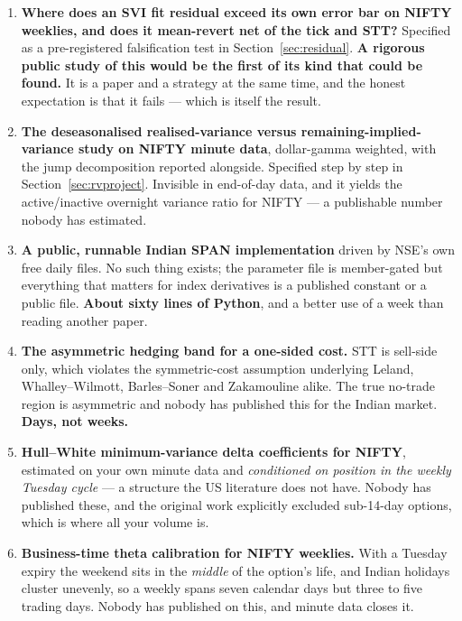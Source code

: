 \documentclass[11pt,a4paper]{article}
\begin{document}
\begin{enumerate}
\item \textbf{Where does an SVI fit residual exceed its own error bar on NIFTY
weeklies, and does it mean-revert net of the tick and STT?} Specified as a
pre-registered falsification test in Section~\ref{sec:residual}. \textbf{A rigorous
public study of this would be the first of its kind that could be found.} It is a
paper and a strategy at the same time, and the honest expectation is that it fails
--- which is itself the result.

\item \textbf{The deseasonalised realised-variance versus remaining-implied-variance
study on NIFTY minute data}, dollar-gamma weighted, with the jump decomposition
reported alongside. Specified step by step in Section~\ref{sec:rvproject}. Invisible
in end-of-day data, and it yields the active/inactive overnight variance ratio for
NIFTY --- a publishable number nobody has estimated.

\item \textbf{A public, runnable Indian SPAN implementation} driven by NSE's own
free daily files. No such thing exists; the parameter file is member-gated but
everything that matters for index derivatives is a published constant or a public
file. \textbf{About sixty lines of Python}, and a better use of a week than reading
another paper.

\item \textbf{The asymmetric hedging band for a one-sided cost.} STT is sell-side
only, which violates the symmetric-cost assumption underlying Leland,
Whalley--Wilmott, Barles--Soner and Zakamouline alike. The true no-trade region is
asymmetric and nobody has published this for the Indian market. \textbf{Days, not
weeks.}

\item \textbf{Hull--White minimum-variance delta coefficients for NIFTY}, estimated
on your own minute data and \emph{conditioned on position in the weekly Tuesday
cycle} --- a structure the US literature does not have. Nobody has published these,
and the original work explicitly excluded sub-14-day options, which is where all
your volume is.

\item \textbf{Business-time theta calibration for NIFTY weeklies.} With a Tuesday
expiry the weekend sits in the \emph{middle} of the option's life, and Indian
holidays cluster unevenly, so a weekly spans seven calendar days but three to five
trading days. Nobody has published on this, and minute data closes it.


\end{enumerate}
\end{document}
